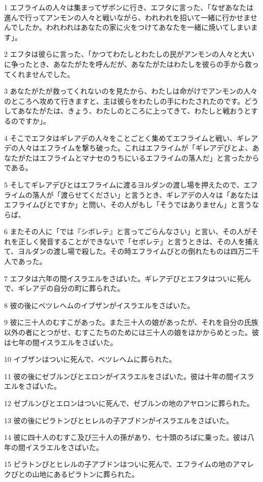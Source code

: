 \par 1 エフライムの人々は集まってザポンに行き、エフタに言った、「なぜあなたは進んで行ってアンモンの人々と戦いながら、われわれを招いて一緒に行かせませんでしたか。われわれはあなたの家に火をつけてあなたを一緒に焼いてしまいます」。
\par 2 エフタは彼らに言った、「かつてわたしとわたしの民がアンモンの人々と大いに争ったとき、あなたがたを呼んだが、あなたがたはわたしを彼らの手から救ってくれませんでした。
\par 3 あなたがたが救ってくれないのを見たから、わたしは命がけでアンモンの人々のところへ攻めて行きますと、主は彼らをわたしの手にわたされたのです。どうしてあなたがたは、きょう、わたしのところに上ってきて、わたしと戦おうとするのですか」。
\par 4 そこでエフタはギレアデの人々をことごとく集めてエフライムと戦い、ギレアデの人々はエフライムを撃ち破った。これはエフライムが「ギレアデびとよ、あなたがたはエフライムとマナセのうちにいるエフライムの落人だ」と言ったからである。
\par 5 そしてギレアデびとはエフライムに渡るヨルダンの渡し場を押えたので、エフライムの落人が「渡らせてください」と言うとき、ギレアデの人々は「あなたはエフライムびとですか」と問い、その人がもし「そうではありません」と言うならば、
\par 6 またその人に「では『シボレテ』と言ってごらんなさい」と言い、その人がそれを正しく発音することができないで「セボレテ」と言うときは、その人を捕えて、ヨルダンの渡し場で殺した。その時エフライムびとの倒れたものは四万二千人であった。
\par 7 エフタは六年の間イスラエルをさばいた。ギレアデびとエフタはついに死んで、ギレアデの自分の町に葬られた。
\par 8 彼の後にベツレヘムのイブザンがイスラエルをさばいた。
\par 9 彼に三十人のむすこがあった。また三十人の娘があったが、それを自分の氏族以外の者にとつがせ、むすこたちのためには三十人の娘をほかからめとった。彼は七年の間イスラエルをさばいた。
\par 10 イブザンはついに死んで、ベツレヘムに葬られた。
\par 11 彼の後にゼブルンびとエロンがイスラエルをさばいた。彼は十年の間イスラエルをさばいた。
\par 12 ゼブルンびとエロンはついに死んで、ゼブルンの地のアヤロンに葬られた。
\par 13 彼の後にピラトンびとヒレルの子アブドンがイスラエルをさばいた。
\par 14 彼に四十人のむすこ及び三十人の孫があり、七十頭のろばに乗った。彼は八年の間イスラエルをさばいた。
\par 15 ピラトンびとヒレルの子アブドンはついに死んで、エフライムの地のアマレクびとの山地にあるピラトンに葬られた。

